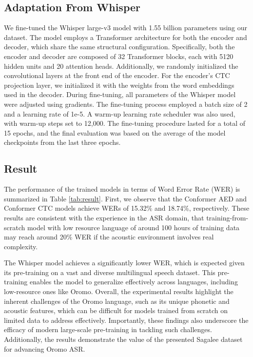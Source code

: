 \documentclass[conference, 9pt]{IEEEtran}
\begin{document}
\subsection{Adaptation From Whisper}
We fine-tuned the Whisper \cite{radford2022whisper} large-v3 model with 1.55 billion parameters using our dataset. The model employs a Transformer architecture for both the encoder and decoder, which share the same structural configuration. Specifically, both the encoder and decoder are composed of 32 Transformer blocks, each with 5120 hidden units and 20 attention heads. Additionally, we randomly initialized the convolutional layers at the front end of the encoder. For the encoder’s CTC projection layer, we initialized it with the weights from the word embeddings used in the decoder.
During fine-tuning, all parameters of the Whisper model were adjusted using gradients. The fine-tuning process employed a batch size of 2 and a learning rate of 1e-5. A warm-up learning rate scheduler was also used, with warm-up steps set to 12,000. The fine-tuning procedure lasted for a total of 15 epochs, and the final evaluation was based on the average of the model checkpoints from the last three epochs.

\subsection{Result}
\label{sec:result}
The performance of the trained models in terms of Word Error Rate (WER) is summarized in Table \ref{tab:result}. First, we observe that the Conformer AED and Conformer CTC models achieve WERs of 15.32\% and 18.74\%, respectively. These results are consistent with the experience in the ASR domain, that training-from-scratch model with low resource language of around 100 hours of training data may reach around 20\% WER \cite{damania22_interspeech} if the acoustic environment involves real complexity.

The Whisper model achieves a significantly lower WER, which is expected given its pre-training on a vast and diverse multilingual speech dataset. This pre-training enables the model to generalize effectively across languages, including low-resource ones like Oromo. Overall, the experimental results highlight the inherent challenges of the Oromo language, such as its unique phonetic and acoustic features, which can be difficult for models trained from scratch on limited data to address effectively. Importantly, these findings also underscore the efficacy of modern large-scale pre-training in tackling such challenges. Additionally, the results demonstrate the  value of the presented Sagalee dataset for advancing Oromo ASR.
 
\end{document}
